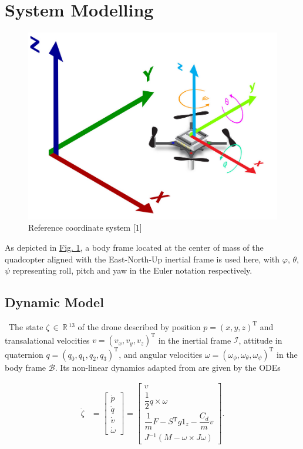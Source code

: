 \documentclass[conference]{IEEEtran}
\begin{document}
\section{System Modelling}\label{Section2}
\begin{figure}[htbp]
	\centerline{\includegraphics[scale = 0.4]{figures/ordinate.png} }
	\caption{Reference coordinate system [1]}
	\label{Fig1}
\end{figure}
As depicted in \hyperref[Fig1]{Fig. 1}, a body frame located at the center of mass of the quadcopter aligned with the East-North-Up inertial frame is used here, with $\varphi$, $\theta$, $\psi$ representing roll, pitch and yaw in the Euler notation respectively.

\subsection{Dynamic Model}\
The state ${\zeta\,\in\,\mathbb{R}\,\mathrm{^{13}}}$ of the drone described by position ${p = (x, y, z)^{\mathrm{T}}}$ and transalational velocities ${v = (v_x, v_y, v_z)^\mathrm{T}}$ in the inertial frame $\mathcal{I}$, attitude in quaternion ${q = (q_{0}, q_{1}, q_{2}, q_{3})^{\mathrm{T}}}$, and angular velocities ${\omega = (\omega_{\phi}, \omega_{\theta}, \omega_{\psi})^{\mathrm{T}}}$ in the body frame $\mathcal{B}$. Its non-linear dynamics adapted from \cite{carlos_efficient_2020} are given by the ODEs

\begin{align}
\dot{\zeta} &= \begin{bmatrix}
	\dot{p} \\
	\dot{q}\\
	\dot{v}\\
	\dot{\omega}
\end{bmatrix} =
\begin{bmatrix}
    v \\
    \dfrac{1}{2}q\times \omega\\
    \dfrac{1}{m}F - S\mathrm{^{T}}g1_z - \dfrac{C_d}{m} v\\
    J\mathrm{^{-1}}\left(M - \omega \times J \omega\right)
\end{bmatrix}.
\end{align}
\end{document}
